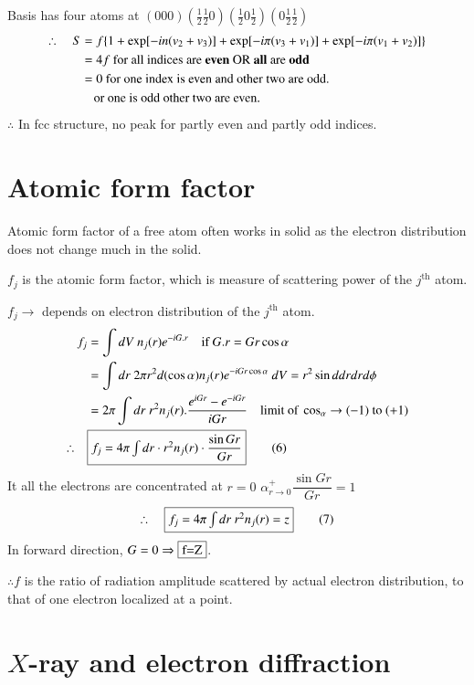 Basis has four atoms at $(000) (\frac{1}{2}\frac{1}{2}0)(\frac{1}{2}0\frac{1}{2})(0\frac{1}{2}\frac{1}{2})$
\begin{align*}
\therefore\quad S &= f\{1+\exp[-in(v_{2}+v_{3})]+\exp[-i\pi(v_{3}+v_{1})]+\exp[-i\pi(v_{1}+v_{2})]\}\\
&= 4f \text{ for all indices are {\bf even} OR {\bf all} are {\bf odd}}\\
&= 0 \text{ for one index is even and other two are odd.}\\
&\quad \text{or one is odd other two are even.}
\end{align*}
$\therefore$ In fcc structure, no peak for partly even and partly odd indices.

\section*{Atomic form factor}

Atomic form factor of a free atom often works in solid as the electron distribution does not change much in the solid.

$f_{j}$ is the atomic form factor, which is measure of scattering power of the $j^{\text{th}}$ atom.

$f_{j}\to$ depends on electron distribution of the $j^{\text{th}}$ atom.
\begin{align*}
f_{j} &= \int dV \ n_{j}(r)e^{-i G.r}\quad \text{if } G.r=Gr\cos \alpha\\
&= \int dr \ 2\pi r^{2} d(\cos \alpha)n_{j}(r)e^{-iGr \cos \alpha} \ dV= r^{2} \sin d drdrd\phi\\
&= 2\pi \int dr \ r^{2}n_{j}(r).\dfrac{e^{iGr}-e^{-iGr}}{iGr}\quad\text{limit of } \cos_{\alpha}\to (-1)\text{ to } (+1)\\
\therefore\quad & \fbox{$f_{j}=4\pi \int dr\cdot r^{2}n_{j}(r)\cdot \dfrac{\sin Gr}{Gr}$}\tag{6}\label{lec14-eq6}
\end{align*}
It all the electrons are concentrated at $r=0$ $\alpha^{+}_{r\to 0}\dfrac{\sin Gr}{Gr}=1$
\begin{equation*}
\therefore\quad \fbox{$f_{j}=4\pi \int dr \ r^{2}n_{j}(r)=z$}\tag{7}\label{lec14-eq7}
\end{equation*}
In forward direction, $G=0\Rightarrow \fbox{f=Z}$.

$\therefore f$ is the ratio of radiation amplitude scattered by actual electron distribution, to that of one electron localized at a point.

\section*{$X$-ray and electron diffraction}

